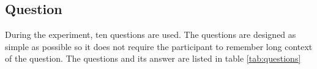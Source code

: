 \subsection{Question}
During the experiment, ten questions are used. The questions are designed as simple as possible so it does not require the participant to remember long context of the question.
The questions and its answer are listed in table \ref{tab:questions}


